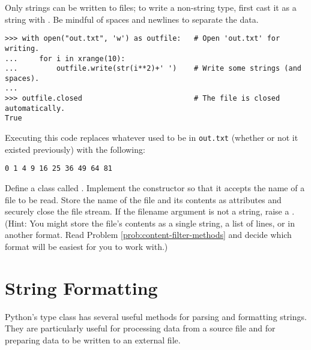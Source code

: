 Only strings can be written to files; to write a non-string type, first cast it as a string with .
Be mindful of spaces and newlines to separate the data.

\begin{lstlisting}
>>> with open("out.txt", 'w') as outfile:   # Open 'out.txt' for writing.
...     for i in xrange(10):
...         outfile.write(str(i**2)+' ')    # Write some strings (and spaces).
...
>>> outfile.closed                          # The file is closed automatically.
True
\end{lstlisting}

Executing this code replaces whatever used to be in \texttt{out.txt} (whether or not it existed previously) with the following:

\begin{lstlisting}
0 1 4 9 16 25 36 49 64 81
\end{lstlisting}

\begin{problem} %
Define a class called .
Implement the constructor so that it accepts the name of a file to be read.
Store the name of the file and its contents as attributes and securely close the file stream.
If the filename argument is not a string, raise a .
\\
(Hint: You might store the file's contents as a single string, a list of lines, or in another format.
Read Problem \ref{prob:content-filter-methods} and decide which format will be easiest for you to work with.)
\end{problem}

\section*{String Formatting} %

Python's  type class has several useful methods for parsing and formatting strings.
They are particularly useful for processing data from a source file and for preparing data to be written to an external file.

